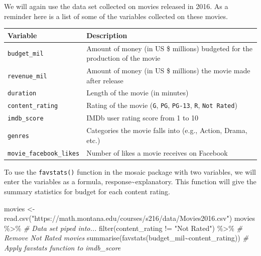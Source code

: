 \documentclass[
]{report}
\newenvironment{Shaded}{\begin{snugshade}}{\end{snugshade}}
\newcommand{\CommentTok}[1]{\textcolor[rgb]{0.56,0.35,0.01}{\textit{#1}}}
\newcommand{\FunctionTok}[1]{\textcolor[rgb]{0.00,0.00,0.00}{#1}}
\newcommand{\NormalTok}[1]{#1}
\newcommand{\OtherTok}[1]{\textcolor[rgb]{0.56,0.35,0.01}{#1}}
\newcommand{\SpecialCharTok}[1]{\textcolor[rgb]{0.00,0.00,0.00}{#1}}
\newcommand{\StringTok}[1]{\textcolor[rgb]{0.31,0.60,0.02}{#1}}
\begin{document}
We will again use the data set collected on movies released in 2016. As a reminder here is a list of some of the variables collected on these movies.

\begin{longtable}[]{@{}
  >{\raggedright\arraybackslash}p{}
  >{\raggedright\arraybackslash}p{}@{}}
\toprule
\textbf{Variable} & \textbf{Description} \\
\midrule
\endhead
\texttt{budget\_mil} & Amount of money (in US \$ millions) budgeted for the production of the movie \\
\texttt{revenue\_mil} & Amount of money (in US \$ millions) the movie made after release \\
\texttt{duration} & Length of the movie (in minutes) \\
\texttt{content\_rating} & Rating of the movie (\texttt{G}, \texttt{PG}, \texttt{PG-13}, \texttt{R}, \texttt{Not\ Rated}) \\
\texttt{imdb\_score} & IMDb user rating score from 1 to 10 \\
\texttt{genres} & Categories the movie falls into (e.g., Action, Drama, etc.) \\
\texttt{movie\_facebook\_likes} & Number of likes a movie receives on Facebook \\
\bottomrule
\end{longtable}

\newpage

To use the \texttt{favstats()} function in the mosaic package with two variables, we will enter the variables as a formula, response\textasciitilde explanatory. This function will give the summary statistics for budget for each content rating.

\begin{Shaded}
\begin{Highlighting}[]
\NormalTok{movies }\OtherTok{\textless{}{-}} \FunctionTok{read.csv}\NormalTok{(}\StringTok{"https://math.montana.edu/courses/s216/data/Movies2016.csv"}\NormalTok{)}
\NormalTok{movies }\SpecialCharTok{\%\textgreater{}\%} \CommentTok{\# Data set piped into...}
  \FunctionTok{filter}\NormalTok{(content\_rating }\SpecialCharTok{!=} \StringTok{"Not Rated"}\NormalTok{) }\SpecialCharTok{\%\textgreater{}\%} \CommentTok{\# Remove Not Rated movies}
  \FunctionTok{summarise}\NormalTok{(}\FunctionTok{favstats}\NormalTok{(budget\_mil}\SpecialCharTok{\textasciitilde{}}\NormalTok{content\_rating)) }\CommentTok{\# Apply favstats function to imdb\_score}
\end{Highlighting}
\end{Shaded}
\end{document}
